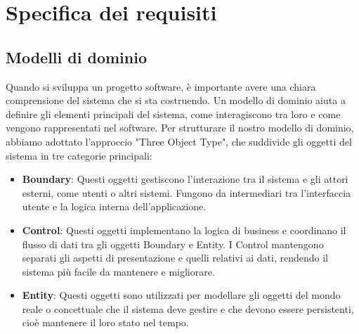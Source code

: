 \section{Specifica dei requisiti}
\subsection{Modelli di dominio}
Quando si sviluppa un progetto software, è importante avere una chiara comprensione del sistema che si sta costruendo. Un modello di dominio aiuta a definire gli elementi principali del sistema, come interagiscono tra loro e come vengono rappresentati nel software.\sskip
Per strutturare il nostro modello di dominio, abbiamo adottato l'approccio "Three Object Type", che suddivide gli oggetti del sistema in tre categorie principali:
\begin{itemize}
	\item \textbf{Boundary}: Questi oggetti gestiscono l'interazione tra il sistema e gli attori esterni, come utenti o altri sistemi. Fungono da intermediari tra l'interfaccia utente e la logica interna dell'applicazione.
	\item \textbf{Control}: Questi oggetti implementano la logica di business e coordinano il flusso di dati tra gli oggetti Boundary e Entity. I Control mantengono separati gli aspetti di presentazione e quelli relativi ai dati, rendendo il sistema più facile da mantenere e migliorare.
	\item \textbf{Entity}: Questi oggetti sono utilizzati per modellare gli oggetti del mondo reale o concettuale che il sistema deve gestire e che devono essere persistenti, cioè mantenere il loro stato nel tempo.
\end{itemize}
\newpage

